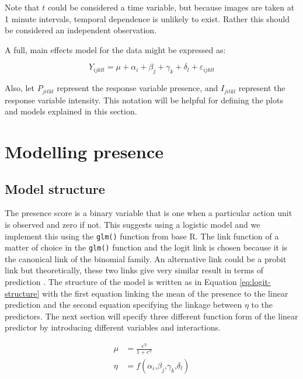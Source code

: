\documentclass{monashthesis}
\begin{document}
Note that \(t\) could be considered a time variable, but because images are taken at 1 minute intervals, temporal dependence is unlikely to exist. Rather this should be considered an independent observation.

A full, main effects model for the data might be expressed as:

\[Y_{ijklt} = \mu + \alpha_i + \beta_j + \gamma_k + \delta_l + \varepsilon_{ijklt}\]

\noindent Also, let \(P_{jitkl}\) represent the response variable presence, and \(I_{jitkl}\) represent the response variable intensity. This notation will be helpful for defining the plots and models explained in this section.

\hypertarget{modelling-presence}{%
\section{Modelling presence}\label{modelling-presence}}

\hypertarget{model-structure}{%
\subsection{Model structure}\label{model-structure}}

The presence score is a binary variable that is one when a particular action unit is observed and zero if not. This suggests using a logistic model and we implement this using the \texttt{glm()} function from base R. The link function of a matter of choice in the \texttt{glm()} function and the logit link is chosen because it is the canonical link of the binomial family. An alternative link could be a probit link but theoretically, these two links give very similar result in terms of prediction \autocite{faraway2016extending}. The structure of the model is written as in Equation \ref{eq:logit-structure} with the first equation linking the mean of the presence to the linear prediction and the second equation specifying the linkage between \(\eta\) to the predictors. The next section will specify three different function form of the linear predictor by introducing different variables and interactions.

\begin{align}\label{eq:logit-structure}
\mu &= \frac{e^{\eta}}{1 + e^{\eta}} \\
\eta &= f(\alpha_i\text{,}\beta_j\text{,}\gamma_k\text{,}\delta_l)
\end{align}
\end{document}

